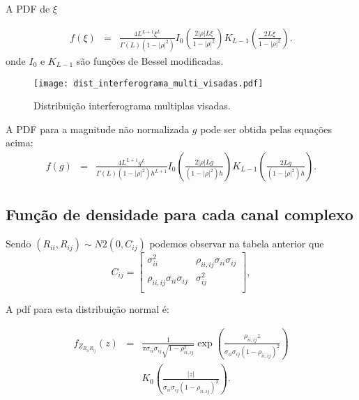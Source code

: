 A PDF de $\xi$

\begin{equation}
\begin{array}{ccc}
	f(\xi)&=&\frac{4L^{L+1}\xi^L}{\Gamma(L)(1-|\rho|^2)}I_0\left(\frac{2|\rho|L\xi}{1-|\rho|^2}\right)K_{L-1}\left(\frac{2L\xi}{1-|\rho|^2}\right).
		\end{array}
\end{equation}
onde $I_0$ e $K_{L-1}$ são funções de Bessel modificadas.

\begin{figure}[hbt]
\centering
\texttt{[image: dist\_interferograma\_multi\_visadas.pdf]}
	\caption{Distribuição interferograma multiplas visadas.}
\label{fig2}
\end{figure}


A PDF para a magnitude não normalizada $g$ pode ser obtida pelas equações acima:
\begin{equation}
\begin{array}{ccc}
	f(g)&=&\frac{4L^{L+1}g^L}{\Gamma(L)(1-|\rho|^2)h^{L+1}}I_0\left(\frac{2|\rho|Lg}{(1-|\rho|^2)h}\right)K_{L-1}\left(\frac{2Lg}{(1-|\rho|^2)h}\right).
		\end{array}
\end{equation}




\subsection{Função de densidade para cada canal complexo}

Sendo $(R_{ii}, R_{ij})\sim N2(0, C_{ij})$ podemos observar na tabela anterior que 
\begin{equation}
C_{ij}=\left[
\begin{array}{cc}
	\sigma_{ii}^2   &  \rho_{ii,ij}\sigma_{ii}\sigma_{ij}  \\
	\rho_{ii,ij}\sigma_{ii}\sigma_{ij} & \sigma_{ij}^2   \\
\end{array}
\right],
\end{equation}

A pdf para esta distribuição normal é:

\begin{equation}
\begin{array}{ccc}
	f_{Z_{R_{ii}R_{ij}}}(z)&=&\frac{1}{\pi\sigma_{ii}\sigma_{ij}\sqrt{1-\rho_{ii,ij}^2}}\exp\left(\frac{\rho_{ii,ij}z}{\sigma_{ii}\sigma_{ij}(1-\rho_{ii,ij})^2}\right)\\
	&&K_0\left(\frac{|z|}{\sigma_{ii}\sigma_{ij}(1-\rho_{ii,ij})^2}\right).
\end{array}
\end{equation}



